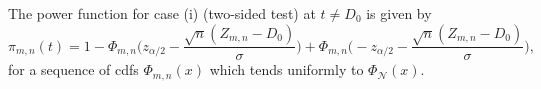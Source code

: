 \documentclass[12pt]{article}
\begin{document}
The power function for case (i) (two-sided test) at $t\neq D_0$ is given by
$$
\pi_{m,n}(t)=1-\Phi_{m,n}\Big(z_{\alpha/2}-\frac{\sqrt{n}(Z_{m,n}-D_0)}{\sigma}\Big)+\Phi_{m,n}\Big(-z_{\alpha/2}-\frac{\sqrt{n}(Z_{m,n}-D_0)}{\sigma}\Big),
$$
for a sequence of cdfs $\Phi_{m,n}(x)$ which tends uniformly to $\Phi_{\mathcal N}(x)$.



\end{document}
